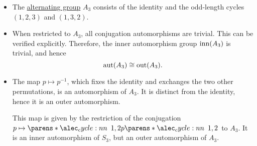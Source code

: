 \begin{example}
\begin{itemize}
    \item The \hyperref[def:alternating_group]{alternating group} \( A_3 \) consists of the identity and the odd-length cycles \( (1, 2, 3) \) and \( (1, 3, 2) \).

    \item When restricted to \( A_3 \), all conjugation automorphisms are trivial. This can be verified explicitly. Therefore, the inner automorphism group \( \operatorname{inn}(A_3) \) is trivial, and hence
    \begin{equation*}
      \operatorname{aut}(A_3) \cong \operatorname{out}(A_3).
    \end{equation*}

    \item The map \( p \mapsto p^{-1} \), which fixes the identity and exchanges the two other permutations, is an automorphism of \( A_3 \). It is distinct from the identity, hence it is an outer automorphism.

    This map is given by the restriction of the conjugation \( p \mapsto \cycle{1, 2} p \cycle{1, 2} \) to \( A_3 \). It is an inner automorphism of \( S_3 \), but an outer automorphism of \( A_3 \).
  \end{itemize}
\end{example}

